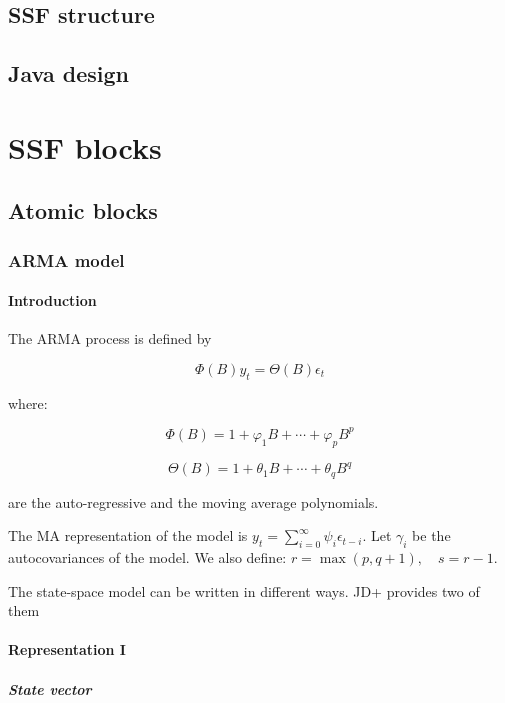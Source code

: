 \documentclass[
  letterpaper,
  DIV=11,
  numbers=noendperiod]{scrreprt}
\begin{document}
\chapter{SSF structure}\label{ssf-structure}

\chapter{Java design}\label{java-design}

\part{SSF blocks}

\chapter{Atomic blocks}\label{atomic-blocks}

\section{ARMA model}\label{arma-model}

\subsection{Introduction}\label{introduction-1}

The ARMA process is defined by

\[\Phi\left(B\right)y_t=\Theta\left(B\right)\epsilon_t \]

where:

\[\Phi\left(B\right)=1+\varphi_1 B + \cdots + \varphi_p B^p \]

\[\Theta\left(B\right)=1+\theta_1 B + \cdots + \theta_q B^q \]

are the auto-regressive and the moving average polynomials.

The MA representation of the model is
\(y_t=\sum_{i=0}^\infty {\psi_i \epsilon_{t-i}}\). Let \(\gamma_i\) be
the autocovariances of the model. We also define:
\(r=\max\left(p, q+1\right), \quad s=r-1\).

The state-space model can be written in different ways. JD+ provides two
of them

\subsection{Representation I}\label{representation-i}

\subsubsection{State vector}\label{state-vector}
\end{document}
